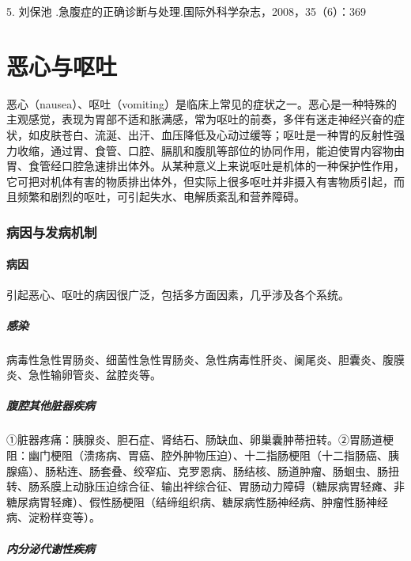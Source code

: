 5. 刘保池 .急腹症的正确诊断与处理.国际外科学杂志，2008，35（6）：369

\protect\hypertarget{text00028.html}{}{}

\chapter{恶心与呕吐}

恶心（nausea）、呕吐（vomiting）是临床上常见的症状之一。恶心是一种特殊的主观感觉，表现为胃部不适和胀满感，常为呕吐的前奏，多伴有迷走神经兴奋的症状，如皮肤苍白、流涎、出汗、血压降低及心动过缓等；呕吐是一种胃的反射性强力收缩，通过胃、食管、口腔、膈肌和腹肌等部位的协同作用，能迫使胃内容物由胃、食管经口腔急速排出体外。从某种意义上来说呕吐是机体的一种保护性作用，它可把对机体有害的物质排出体外，但实际上很多呕吐并非摄入有害物质引起，而且频繁和剧烈的呕吐，可引起失水、电解质紊乱和营养障碍。

\subsection{病因与发病机制}

\subsubsection{病因}

引起恶心、呕吐的病因很广泛，包括多方面因素，几乎涉及各个系统。

\paragraph{感染}

病毒性急性胃肠炎、细菌性急性胃肠炎、急性病毒性肝炎、阑尾炎、胆囊炎、腹膜炎、急性输卵管炎、盆腔炎等。

\paragraph{腹腔其他脏器疾病}

①脏器疼痛：胰腺炎、胆石症、肾结石、肠缺血、卵巢囊肿蒂扭转。②胃肠道梗阻：幽门梗阻（溃疡病、胃癌、腔外肿物压迫）、十二指肠梗阻（十二指肠癌、胰腺癌）、肠粘连、肠套叠、绞窄疝、克罗恩病、肠结核、肠道肿瘤、肠蛔虫、肠扭转、肠系膜上动脉压迫综合征、输出袢综合征、胃肠动力障碍（糖尿病胃轻瘫、非糖尿病胃轻瘫）、假性肠梗阻（结缔组织病、糖尿病性肠神经病、肿瘤性肠神经病、淀粉样变等）。

\paragraph{内分泌代谢性疾病}

